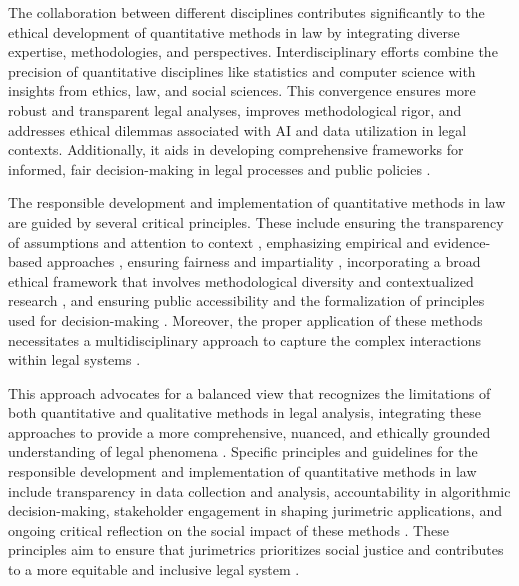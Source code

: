 The collaboration between different disciplines contributes significantly to the ethical development of quantitative methods in law by integrating diverse expertise, methodologies, and perspectives. Interdisciplinary efforts combine the precision of quantitative disciplines like statistics and computer science with insights from ethics, law, and social sciences. This convergence ensures more robust and transparent legal analyses, improves methodological rigor, and addresses ethical dilemmas associated with AI and data utilization in legal contexts. Additionally, it aids in developing comprehensive frameworks for informed, fair decision-making in legal processes and public policies \cite{di2023, ribeiro2021, massuanganhe2016, sareen2020, saltelli2020}.

The responsible development and implementation of quantitative methods in law are guided by several critical principles. These include ensuring the transparency of assumptions and attention to context \cite{di2023}, emphasizing empirical and evidence-based approaches \cite{nunes2018}, ensuring fairness and impartiality \cite{ribeiro2021, silva2023}, incorporating a broad ethical framework that involves methodological diversity and contextualized research \cite{sareen2020}, and ensuring public accessibility and the formalization of principles used for decision-making \cite{massuanganhe2016}. Moreover, the proper application of these methods necessitates a multidisciplinary approach to capture the complex interactions within legal systems \cite{di2023}.

This approach advocates for a balanced view that recognizes the limitations of both quantitative and qualitative methods in legal analysis, integrating these approaches to provide a more comprehensive, nuanced, and ethically grounded understanding of legal phenomena \cite{10.1590/dados.2022.65.3.267,10.1057/s41599-020-0396-5}. Specific principles and guidelines for the responsible development and implementation of quantitative methods in law include transparency in data collection and analysis, accountability in algorithmic decision-making, stakeholder engagement in shaping jurimetric applications, and ongoing critical reflection on the social impact of these methods \cite{10.1590/dados.2022.65.3.267,10.1057/s41599-020-0396-5}. These principles aim to ensure that jurimetrics prioritizes social justice and contributes to a more equitable and inclusive legal system \cite{10.1590/dados.2022.65.3.267,10.1057/s41599-020-0396-5}.

